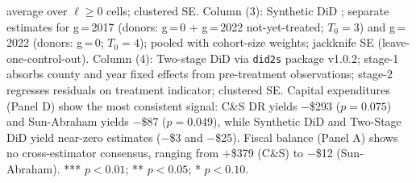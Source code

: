 \documentclass[12pt]{article}
\begin{document}
\begin{table}[h!]
\begin{threeparttable}
\begin{tablenotes}[flushleft]
average over $\ell \geq 0$ cells; clustered SE.
Column (3): Synthetic DiD \citep{arkhangelsky2021}; separate estimates for g\,=\,2017
(donors: g\,=\,0 + g\,=\,2022 not-yet-treated; $T_0=3$) and g\,=\,2022 (donors: g\,=\,0;
$T_0=4$); pooled with cohort-size weights; jackknife SE (leave-one-control-out).
Column (4): Two-stage DiD \citep{gardner2022} via \texttt{did2s} package v1.0.2;
stage-1 absorbs county and year fixed effects from pre-treatment observations;
stage-2 regresses residuals on treatment indicator; clustered SE.
Capital expenditures (Panel D) show the most consistent signal: C\&S DR yields
$-$\$293 ($p = 0.075$) and Sun-Abraham yields $-$\$87 ($p = 0.049$), while Synthetic DiD
and Two-Stage DiD yield near-zero estimates ($-$\$3 and $-$\$25). Fiscal balance
(Panel A) shows no cross-estimator consensus, ranging from $+$\$379 (C\&S) to
$-$\$12 (Sun-Abraham).
*** $p < 0.01$; ** $p < 0.05$; * $p < 0.10$.
\end{tablenotes}
\end{threeparttable}
\end{table}

\clearpage
\end{document}
